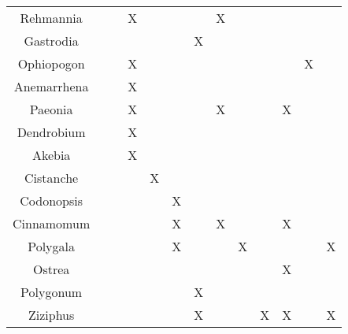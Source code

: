 \begin{table*}[htp]
\begin{tabular}{||c c c c c c c c c c c c c||}
 Rehmannia      &     &     &  X  &      &     &    &  X  &     &      &      &     &     \\
 Gastrodia      &     &     &     &      &     & X  &     &     &      &      &     &     \\
 Ophiopogon     &     &     &  X  &      &     &    &     &     &      &      &  X  &     \\
 Anemarrhena    &     &     &  X  &      &     &    &     &     &      &      &     &     \\
 Paeonia        &     &     &  X  &      &     &    &  X  &     &      &  X   &     &     \\
 Dendrobium     &     &     &  X  &      &     &    &     &     &      &      &     &     \\
 Akebia         &     &     &  X  &      &     &    &     &     &      &      &     &     \\
 Cistanche      &     &     &     &   X  &     &    &     &     &      &      &     &     \\
 Codonopsis     &     &     &     &      &  X  &    &     &     &      &      &     &     \\
 Cinnamomum     &     &     &     &      &  X  &    &  X  &     &      &   X  &     &     \\
 Polygala       &     &     &     &      &  X  &    &     &  X  &      &      &     &  X   \\

 Ostrea         &     &     &     &      &     &    &     &     &      &   X  &     &     \\
 Polygonum      &     &     &     &      &     & X  &     &     &      &      &     &     \\
 Ziziphus       &     &     &     &      &     & X  &     &     &  X   &   X  &     &  X   \\


\end{tabular}
\end{table*}
